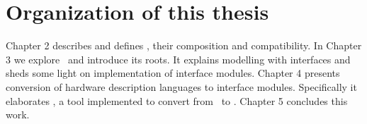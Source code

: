 %
%
%
%
%
%
%
%
%


\section{Organization of this thesis}
Chapter 2 describes and defines {\im}, their composition and
compatibility. In Chapter 3 we explore \chai \ and introduce its
roots. It explains modelling with interfaces and sheds some light
on implementation of interface modules. Chapter 4 presents
conversion of hardware description languages to interface modules.
Specifically it elaborates {\mvrm }, a tool implemented to convert
from \mv \ to {\rm }. Chapter 5 concludes this work.

